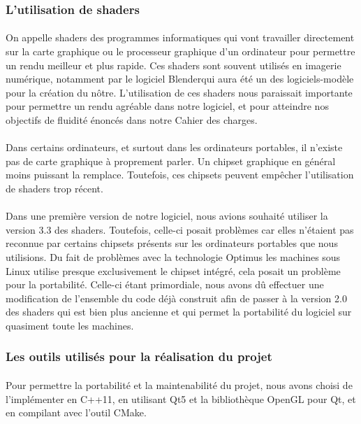 \subsubsection{L'utilisation de shaders}
\paragraph{}
On appelle shaders des programmes informatiques qui vont travailler directement sur la carte graphique ou le processeur graphique d'un ordinateur pour permettre un rendu meilleur et plus rapide. Ces shaders sont souvent utilisés en imagerie numérique, notamment par le logiciel Blender\footnotemark qui aura été un des logiciels-modèle pour la création du nôtre. L'utilisation de ces shaders nous paraissait importante pour permettre un rendu agréable dans notre logiciel, et pour atteindre nos objectifs de fluidité énoncés dans notre Cahier des charges.
\paragraph{}
Dans certains ordinateurs, et surtout dans les ordinateurs portables, il n'existe pas de carte graphique à proprement parler. Un chipset graphique en général moins puissant la remplace. Toutefois, ces chipsets peuvent empêcher l'utilisation de shaders trop récent.

\paragraph{}
Dans une première version de notre logiciel, nous avions souhaité utiliser la version 3.3 des shaders. Toutefois, celle-ci posait problèmes car elles n'étaient pas reconnue par certains chipsets présents sur les ordinateurs portables que nous utilisions. Du fait de problèmes avec la technologie Optimus les machines sous Linux utilise presque exclusivement le chipset intégré, cela posait un problème pour la portabilité. Celle-ci étant primordiale, nous avons dû effectuer une modification de l'ensemble du code déjà construit afin de passer à la version 2.0 des shaders qui est bien plus ancienne et qui permet la portabilité du logiciel sur quasiment toute les machines.

\subsubsection{Les outils utilisés pour la réalisation du projet}
\paragraph{}
Pour permettre la portabilité et la maintenabilité du projet, nous avons choisi de l'implémenter en C++11, en utilisant Qt5 et la bibliothèque OpenGL pour Qt, et en compilant avec l'outil CMake.

